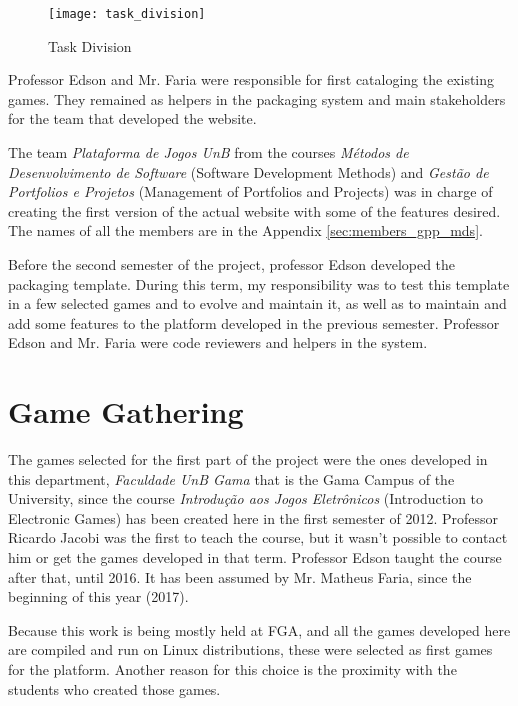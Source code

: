 \begin{figure}[h!]
\centering
\texttt{[image: task\_division]}
\caption{Task Division}
\label{fig:task_division}
\end{figure}

Professor Edson and Mr. Faria were responsible for first cataloging the existing games. They remained as helpers in the packaging system and main stakeholders for the team that developed the website.

The team \textit{Plataforma de Jogos UnB} from the courses \textit{M\'etodos de Desenvolvimento de Software} (Software Development Methods) and \textit{Gest\~ao de Portfolios e Projetos} (Management of Portfolios and Projects) was in charge of creating the first version of the actual website with some of the features desired. The names of all the members are in the Appendix \ref{sec:members_gpp_mds}.

Before the second semester of the project, professor Edson developed the packaging template. During this term, my responsibility was to test this template in a few selected games and to evolve and maintain it, as well as to maintain and add some features to the platform developed in the previous semester. Professor Edson and Mr. Faria were code reviewers and helpers in the system.


\section{Game Gathering}
\label{sec:game_gathering}

The games selected for the first part of the project were the ones developed in this department, \textit{Faculdade UnB Gama} that is the Gama Campus of the University, since the course \textit{Introdu\c{c}\~ao aos Jogos Eletr\^onicos} (Introduction to Electronic Games) has been created here in the first semester of 2012. Professor Ricardo Jacobi was the first to teach the course, but it wasn't possible to contact him or get the games developed in that term. Professor Edson taught the course after that, until 2016. It has been assumed by Mr. Matheus Faria, since the beginning of this year (2017).

Because this work is being mostly held at FGA, and all the games developed here are compiled and run on Linux distributions, these were selected as first games for the platform. Another reason for this choice is the proximity with the students who created those games.

